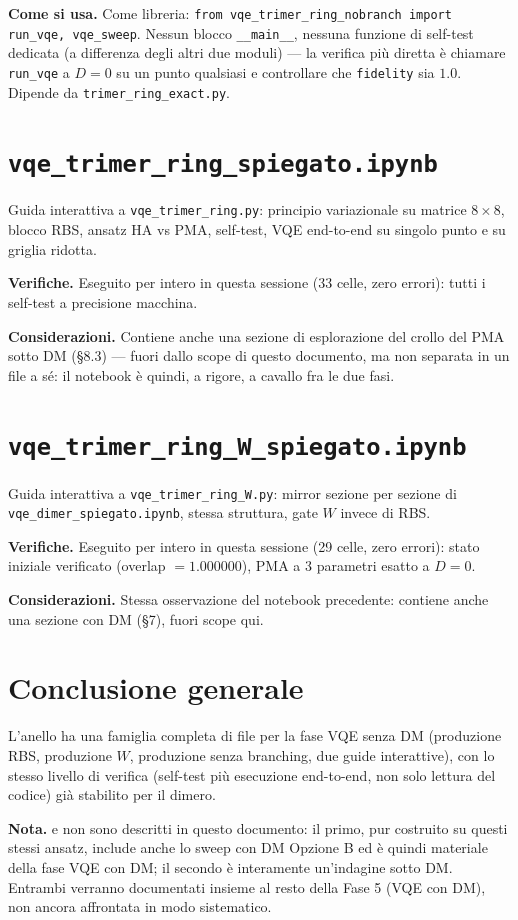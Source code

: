 \documentclass[11pt,a4paper]{article}
\begin{document}
\textbf{Come si usa.} Come libreria: \texttt{from vqe\_trimer\_ring\_nobranch import
run\_vqe, vqe\_sweep}. Nessun blocco \texttt{\_\_main\_\_}, nessuna funzione di
self-test dedicata (a differenza degli altri due moduli) — la verifica più diretta è
chiamare \texttt{run\_vqe} a $D=0$ su un punto qualsiasi e controllare che
\texttt{fidelity} sia $1.0$. Dipende da \texttt{trimer\_ring\_exact.py}.

\section*{\texttt{vqe\_trimer\_ring\_spiegato.ipynb}}

Guida interattiva a \texttt{vqe\_trimer\_ring.py}: principio variazionale su matrice
$8\times8$, blocco RBS, ansatz HA vs PMA, self-test, VQE end-to-end su singolo punto e
su griglia ridotta.

\textbf{Verifiche.} Eseguito per intero in questa sessione (33 celle, zero errori):
tutti i self-test a precisione macchina.

\textbf{Considerazioni.} Contiene anche una sezione di esplorazione del crollo del PMA
sotto DM (§8.3) — fuori dallo scope di questo documento, ma non separata in un file a
sé: il notebook è quindi, a rigore, a cavallo fra le due fasi.

\section*{\texttt{vqe\_trimer\_ring\_W\_spiegato.ipynb}}

Guida interattiva a \texttt{vqe\_trimer\_ring\_W.py}: mirror sezione per sezione di
\texttt{vqe\_dimer\_spiegato.ipynb}, stessa struttura, gate $W$ invece di RBS.

\textbf{Verifiche.} Eseguito per intero in questa sessione (29 celle, zero errori):
stato iniziale verificato (overlap $=1.000000$), PMA a 3 parametri esatto a $D=0$.

\textbf{Considerazioni.} Stessa osservazione del notebook precedente: contiene anche
una sezione con DM (§7), fuori scope qui.

\section*{Conclusione generale}

L'anello ha una famiglia completa di file per la fase VQE senza DM (produzione RBS,
produzione $W$, produzione senza branching, due guide interattive), con lo stesso
livello di verifica (self-test più esecuzione end-to-end, non solo lettura del
codice) già stabilito per il dimero.

\textbf{Nota.} \texttt{} e
\texttt{} non sono descritti in questo
documento: il primo, pur costruito su questi stessi ansatz, include anche lo sweep
con DM Opzione B ed è quindi materiale della fase VQE con DM; il secondo è
interamente un'indagine sotto DM. Entrambi verranno documentati insieme al resto
della Fase 5 (VQE con DM), non ancora affrontata in modo sistematico.
\end{document}
